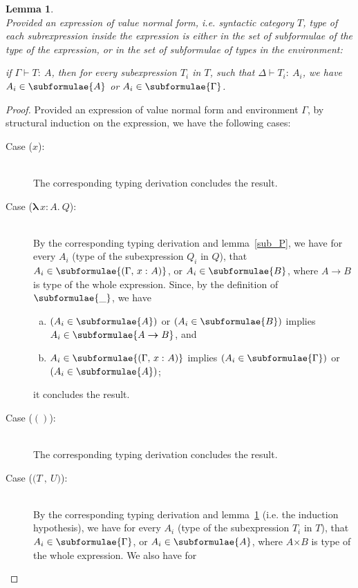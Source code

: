 \documentclass[a4paper]{article}
\newcommand{\typecolor}{}
\newcommand{\termcolor}{}
\newcommand{\tp}[1]{{\typecolor #1}}
\newcommand{\tm}[1]{{\termcolor #1}}
\newtheorem{lemma}[theorem]{Lemma}
\newcommand{\typarr}[2]{#1\boldsymbol{\rightarrow}#2}
\newcommand{\typprd}[2]{#1\boldsymbol{\times}#2}
\newcommand{\expvar}[1]{#1}
\newcommand{\expunt}{\boldsymbol{()}}
\newcommand{\expabs}[3]{\boldsymbol{\lambda}\,#1\boldsymbol{\colon}#2\boldsymbol{.}\ #3}
\newcommand{\expprd}[2]{\boldsymbol{(}#1\ \boldsymbol{,}\ #2\boldsymbol{)}}
\newcommand{\typing}[2]{\tm{#1:\ }\tp{#2}}
\newcommand{\typenvcon}[2]{\tp{\Gamma,}\ \typing{#1}{#2}}
\begin{document}
\begin{lemma}\ \\
\label{sub_V}
Provided an expression of value normal form, i.e. syntactic
category $T$, type of each subrexpression inside the expression is
either in the set of subformulae of the type of the expression, or in
the set of subformulae of types in the environment:

 if $\Gamma \vdash \typing{T}{A}$, then for every subexpression $T_i$
 in $T$, such that $\Delta \vdash \typing{T_i}{A_i}$, we have $A_i \in
 \subformulae{A}$ or $A_i \in \subformulae{\Gamma}$. 
\end{lemma}
\begin{proof}
Provided an expression of value normal form and environment $\Gamma$,
by structural induction on the expression, we have the following cases:
\begin{description}
\item[Case ($\expvar{x}$):]\ \\ 
  The corresponding typing derivation concludes the result. 
\item[Case ($\expabs{x}{A}{Q}$):]\ \\ 
  By the corresponding typing derivation and lemma~\ref{sub_P}, we
  have for every $A_i$ (type of the subexpression $Q_i$ in $Q$), that
  $A_i \in \subformulae{(\typenvcon{x}{A})}$, or $A_i \in
  \subformulae{B}$, where $\typarr{A}{B}$ is type of the whole
  expression. Since, by the definition of $\subformulae{\_}$, we have
  \begin{enumerate}[(a)] 
     \item $(A_i \in \subformulae{A})$ or $(A_i \in \subformulae{B})$ implies $A_i \in \subformulae{\typarr{A}{B}}$, and
     \item $A_i \in \subformulae{(\typenvcon{x}{A})}$ implies $(A_i \in \subformulae{\Gamma})$ or $(A_i \in \subformulae{A})$;
  \end{enumerate}
  it concludes the result.
\item[Case ($\expunt$):]\ \\ 
  The corresponding typing derivation concludes the result. 
\item[Case ($\expprd{T}{U}$):]\ \\ 
  By the corresponding typing derivation and lemma~\ref{sub_V}
  (i.e. the induction hypothesis), we have for every $A_i$ (type of
  the subexpression $T_i$ in $T$), that $A_i \in
  \subformulae{\Gamma}$, or $A_i \in \subformulae{A}$, where
  $\typprd{A}{B}$ is type of the whole expression. We also have for

\end{description}
\end{proof}
\end{document}
